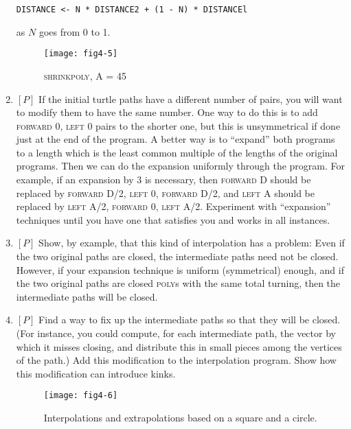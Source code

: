 \documentclass{book}
\begin{document}
\begin{enumerate}
\begin{verbatim}
DISTANCE <- N * DISTANCE2 + (1 - N) * DISTANCEl
\end{verbatim}
as $N$ goes from 0 to 1.

\begin{figure}
\begin{center}
\texttt{[image: fig4-5]}
\caption{\textsc{shrinkpoly}, A = 45}
\end{center}
\end{figure}


\item $[P]$ If the initial turtle paths have a different number of pairs, you
will want to modify them to have the same number. One way to do
this is to add \textsc{forward} 0, \textsc{left} 0 pairs to the shorter one, but this is
unsymmetrical if done just at the end of the program. A better way is to
``expand'' both programs to a length which is the least common multiple
of the lengths of the original programs. Then we can do the expansion
uniformly through the program. For example, if an expansion by 3 is
necessary, then \textsc{forward} D should be replaced by \textsc{forward} D/2, \textsc{left} 0,
\textsc{forward} D/2, and \textsc{left} A should be replaced by \textsc{left} A/2, \textsc{forward} 0,
\textsc{left} A/2. Experiment with ``expansion'' techniques until you have one
that satisfies you and works in all instances.

\item $[P]$ Show, by example, that this kind of interpolation has a problem:
Even if the two original paths are closed, the intermediate paths need not
be closed. However, if your expansion technique is uniform (symmetrical)
enough, and if the two original paths are closed \textsc{poly}s with the same
total turning, then the intermediate paths will be closed.

\item $[P]$ Find a way to fix up the intermediate paths so that they will
be closed. (For instance, you could compute, for each intermediate
path, the vector by which it misses closing, and distribute this in small
pieces among the vertices of the path.) Add this modification to the
interpolation program. Show how this modification can introduce kinks.

\begin{figure}
\begin{center}
\texttt{[image: fig4-6]}
\caption{Interpolations and extrapolations based on a square and a circle.}
\end{center}
\end{figure}


\end{enumerate}
\end{document}
